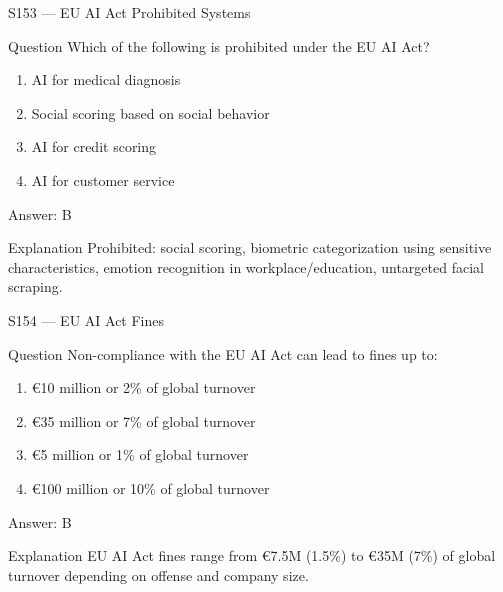 \documentclass[aspectratio=169,8pt]{beamer}
\begin{document}
	\begin{frame}{S153 --- EU AI Act Prohibited Systems}
		\begin{block}{Question}
			Which of the following is prohibited under the EU AI Act?
			\begin{enumerate}
				\item AI for medical diagnosis
				\item Social scoring based on social behavior
				\item AI for credit scoring
				\item AI for customer service
			\end{enumerate}
		\end{block}
		\begin{exampleblock}{Answer: B}\end{exampleblock}
		\begin{block}{Explanation}
			Prohibited: social scoring, biometric categorization using sensitive characteristics, emotion recognition in workplace/education, untargeted facial scraping.
		\end{block}
	\end{frame}
	
	\begin{frame}{S154 --- EU AI Act Fines}
		\begin{block}{Question}
			Non-compliance with the EU AI Act can lead to fines up to:
			\begin{enumerate}
				\item €10 million or 2\% of global turnover
				\item €35 million or 7\% of global turnover
				\item €5 million or 1\% of global turnover
				\item €100 million or 10\% of global turnover
			\end{enumerate}
		\end{block}
		\begin{exampleblock}{Answer: B}\end{exampleblock}
		\begin{block}{Explanation}
			EU AI Act fines range from €7.5M (1.5\%) to €35M (7\%) of global turnover depending on offense and company size.
		\end{block}
	\end{frame}
	
\end{document}

